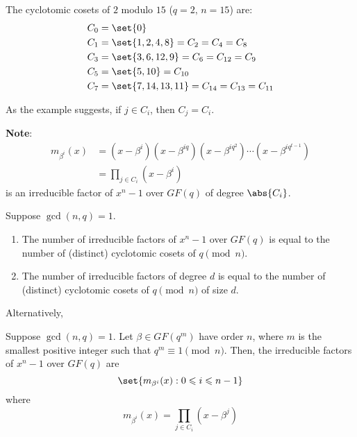 \begin{Example}{}{}
    The cyclotomic cosets of $ 2 $ modulo $ 15 $ ($ q=2,\,n=15 $) are:
    \begin{align*}
        C_0 & =\set{0}                               \\
        C_1 & =\set{1,2,4,8}=C_2=C_4=C_8             \\
        C_3 & =\set{3,6,12,9}=C_6=C_{12}=C_9         \\
        C_5 & =\set{5,10}=C_{10}                     \\
        C_7 & =\set{7,14,13,11}=C_{14}=C_{13}=C_{11}
    \end{align*}
\end{Example}

As the example suggests, if $ j\in C_i $, then $ C_j=C_i $.

\textbf{Note}:
\begin{align*}
    m_{\beta^i}(x)
     & =(x-\beta^i)(x-\beta^{iq})(x-\beta^{iq^2})\cdots(x-\beta^{iq^{t-1}}) \\
     & =\prod_{j\in C_i}(x-\beta^i)
\end{align*}
is an irreducible factor of $ x^n-1 $ over $ GF(q) $ of degree $ \abs{C_i} $.


\begin{Theorem}{}{}
    Suppose $ \gcd(n,q)=1 $.
    \begin{enumerate}[label=(\roman*)]
        \item The number of irreducible factors of $ x^n-1 $
              over $ GF(q) $ is equal to the number of (distinct)
              cyclotomic cosets of $ q\pmod{n} $.
        \item The number of irreducible factors of degree $ d $
              is equal to the number of (distinct)
              cyclotomic cosets of $ q\pmod{n} $ of size $ d $.
    \end{enumerate}
\end{Theorem}


Alternatively,

\begin{Theorem}{}{}
    Suppose $ \gcd(n,q)=1 $. Let $ \beta\in GF(q^m) $ have order
    $ n $, where $ m $ is the smallest positive integer such that
    $ q^m\equiv 1\pmod{n} $. Then, the irreducible factors of $ x^n-1 $
    over $ GF(q) $ are
    \[ \set{m_{\beta^i}(x):0\leqslant i\leqslant n-1} \]
    where
    \[ m_{\beta^i}(x)=\prod_{j\in C_i}(x-\beta^j) \]
\end{Theorem}


